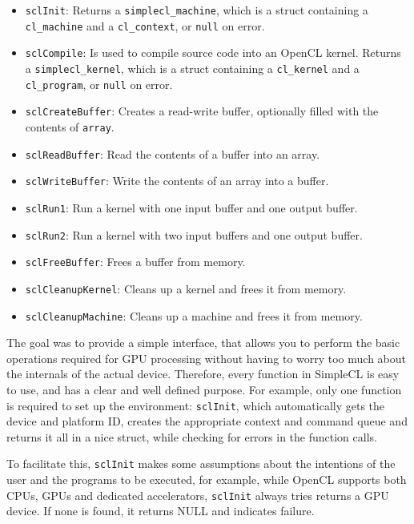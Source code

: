\begin{itemize}
  \item \texttt{sclInit}: Returns a \texttt{simplecl\_machine},
    which is a struct containing a \texttt{cl\_machine} and a
    \texttt{cl\_context}, or \texttt{null} on error.
  \item \texttt{sclCompile}: Is used to compile source code into
    an OpenCL kernel. Returns a \texttt{simplecl\_kernel}, which is a
    struct containing a \texttt{cl\_kernel} and a
    \texttt{cl\_program}, or \texttt{null} on error.
  \item \texttt{sclCreateBuffer}: Creates a read-write buffer,
    optionally filled with the contents of \texttt{array}.
  \item \texttt{sclReadBuffer}: Read the contents of a buffer into an
    array.
  \item \texttt{sclWriteBuffer}: Write the contents of an array into a
    buffer.
  \item \texttt{sclRun1}: Run a kernel with one input buffer and one
    output buffer.
  \item \texttt{sclRun2}: Run a kernel with two input buffers and one
    output buffer.
  \item \texttt{sclFreeBuffer}: Frees a buffer from memory.
  \item \texttt{sclCleanupKernel}: Cleans up a kernel and frees it
    from memory.
  \item \texttt{sclCleanupMachine}: Cleans up a machine and frees it
    from memory.
\end{itemize}

The goal was to provide a simple interface, that allows you to perform
the basic operations required for GPU processing without having to
worry too much about the internals of the actual device. Therefore,
every function in SimpleCL is easy to use, and has a clear and well
defined purpose. For example, only one function is required to set up
the environment: \texttt{sclInit}, which automatically gets the device
and platform ID, creates the appropriate context and command queue and
returns it all in a nice struct, while checking for errors in the
function calls.

To facilitate this, \texttt{sclInit} makes some assumptions about the
intentions of the user and the programs to be executed, for example,
while OpenCL supports both CPUs, GPUs and dedicated accelerators,
\texttt{sclInit} always tries returns a GPU device. If none is found,
it returns NULL and indicates failure.

